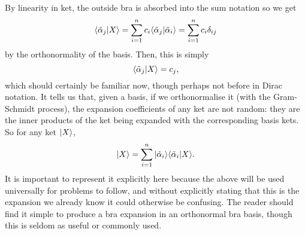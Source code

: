 By linearity in ket, the outside bra is absorbed into the sum notation so we get
$$
\langle\tilde{\alpha}_{j}|X\rangle=\sum_{i=1}^{n}c_{i}\langle\tilde{\alpha}_{j}|\tilde{\alpha}_{i}\rangle=\sum_{i=1}^{n}c_{i}\delta_{ij}
$$
by the orthonormality of the basis. Then, this is simply
$$
\langle\tilde{\alpha}_{j}|X\rangle=c_{j},
$$
which should certainly be familiar now, though perhaps not before in Dirac notation. It tells us that, given a basis, if we orthonormalise it (with the Gram-Schmidt process), the expansion coefficients of any ket are not random: they are the inner products of the ket being expanded with the corresponding basis kets. So for any ket $|X\rangle$,
$$
|X\rangle=\sum_{i=1}^{n}|\tilde{\alpha}_{i}\rangle\langle\tilde{\alpha}_{i}|X\rangle.
$$
It is important to represent it explicitly here because the above will be used universally for problems to follow, and without explicitly stating that this is the expansion we already know it could otherwise be confusing. The reader should find it simple to produce a bra expansion in an orthonormal bra basis, though this is seldom as useful or commonly used.

